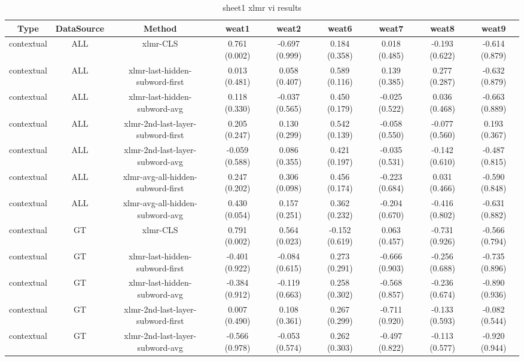 \begin{sidewaystable}[htb]
    \centering
    \caption{sheet1 xlmr vi results}
    \label{appendix_tab:sheet1_xlmr_vi_results}
    \small
    \begin{tabular}{@{}ccccccccc@{}}
        \toprule
        Type & DataSource & Method & weat1 & weat2 & weat6 & weat7 & weat8 & weat9 \\
        \midrule
        contextual & ALL & xlmr-CLS & 0.761 (0.002) & -0.697 (0.999) & 0.184 (0.358) & 0.018 (0.485) & -0.193 (0.622) & -0.614 (0.879) \\
        contextual & ALL & xlmr-last-hidden-subword-first & 0.013 (0.481) & 0.058 (0.407) & 0.589 (0.116) & 0.139 (0.385) & 0.277 (0.287) & -0.632 (0.879) \\
        contextual & ALL & xlmr-last-hidden-subword-avg & 0.118 (0.330) & -0.037 (0.565) & 0.450 (0.179) & -0.025 (0.522) & 0.036 (0.468) & -0.663 (0.889) \\
        contextual & ALL & xlmr-2nd-last-layer-subword-first & 0.205 (0.247) & 0.130 (0.299) & 0.542 (0.139) & -0.058 (0.550) & -0.077 (0.560) & 0.193 (0.367) \\
        contextual & ALL & xlmr-2nd-last-layer-subword-avg & -0.059 (0.588) & 0.086 (0.355) & 0.421 (0.197) & -0.035 (0.531) & -0.142 (0.610) & -0.487 (0.815) \\
        contextual & ALL & xlmr-avg-all-hidden-subword-first & 0.247 (0.202) & 0.306 (0.098) & 0.456 (0.174) & -0.223 (0.684) & 0.031 (0.466) & -0.590 (0.848) \\
        contextual & ALL & xlmr-avg-all-hidden-subword-avg & 0.430 (0.054) & 0.157 (0.251) & 0.362 (0.232) & -0.204 (0.670) & -0.416 (0.802) & -0.631 (0.882) \\
        contextual & GT & xlmr-CLS & 0.791 (0.002) & 0.564 (0.023) & -0.152 (0.619) & 0.063 (0.457) & -0.731 (0.926) & -0.566 (0.794) \\
        contextual & GT & xlmr-last-hidden-subword-first & -0.401 (0.922) & -0.084 (0.615) & 0.273 (0.291) & -0.666 (0.903) & -0.256 (0.688) & -0.735 (0.896) \\
        contextual & GT & xlmr-last-hidden-subword-avg & -0.384 (0.912) & -0.119 (0.663) & 0.258 (0.302) & -0.568 (0.857) & -0.236 (0.674) & -0.890 (0.936) \\
        contextual & GT & xlmr-2nd-last-layer-subword-first & 0.007 (0.490) & 0.108 (0.361) & 0.267 (0.299) & -0.711 (0.920) & -0.133 (0.593) & -0.082 (0.544) \\
        contextual & GT & xlmr-2nd-last-layer-subword-avg & -0.566 (0.978) & -0.053 (0.574) & 0.262 (0.303) & -0.497 (0.822) & -0.113 (0.577) & -0.920 (0.944) \\

\end{tabular}
\end{sidewaystable}

